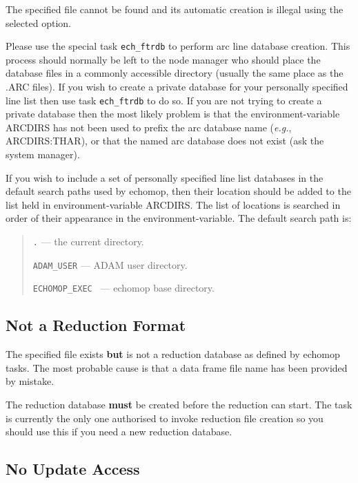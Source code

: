 The specified file cannot be found and its automatic creation is illegal
using the selected option.

Please use the special task \verb+ech_ftrdb+ to perform arc line database
creation. This process should normally be left to the node manager
who should place the database files in a commonly accessible
directory (usually the same place as the .ARC files).  If you wish to create a private database for your
personally specified line list then use task \verb+ech_ftrdb+ to do so. If
you are not trying to create a private database then the most likely
problem is that the environment-variable ARCDIRS has not been used to prefix
the arc database name ({\it{e.g.}}, ARCDIRS:THAR),
or that the named arc database does not exist (ask the system
manager).

If you wish to include a set of personally specified line list databases
in the default search paths used by {\sc echomop,} then their location should
be added to the list held in environment-variable ARCDIRS.  The list of
locations is searched in order of their appearance in the
environment-variable.  The default search path is:

\begin{quote}

   {\tt .} --- the current directory.

   {\tt ADAM\_USER} --- ADAM user directory.

   {\tt ECHOMOP\_EXEC } --- {\sc echomop} base directory.

\end{quote}

\subsection{ Not a Reduction Format}

The specified file exists {\bf but} is not a reduction database as
defined by {\sc echomop} tasks. The most probable cause is that a data frame
file name has been provided by mistake.

The reduction database {\bf must} be created before the reduction
can start. The task
is currently the only one authorised to invoke reduction file creation so you
should use this if you need a new reduction database.

\subsection{ No Update Access}

